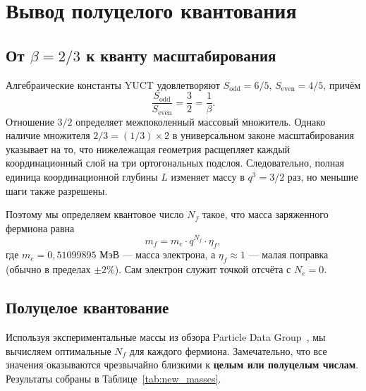 \documentclass[12pt,a4paper]{article}
\newcommand{\Sodd}{S_{\mathrm{odd}}}
\newcommand{\Seven}{S_{\mathrm{even}}}
\begin{document}
	\section{Вывод полуцелого квантования}
	
	\subsection{От \(\beta = 2/3\) к кванту масштабирования}
	
	Алгебраические константы YUCT удовлетворяют \(\Sodd = 6/5\), \(\Seven = 4/5\), причём
	\[
	\frac{\Sodd}{\Seven} = \frac{3}{2} = \frac{1}{\beta}.
	\]
	Отношение \(3/2\) определяет межпоколенный массовый множитель. Однако наличие множителя \(2/3 = (1/3) \times 2\) в универсальном законе масштабирования указывает на то, что нижележащая геометрия расщепляет каждый координационный слой на три ортогональных подслоя. Следовательно, полная единица координационной глубины \(L\) изменяет массу в \(q^3 = 3/2\) раз, но меньшие шаги также разрешены.
	
	Поэтому мы определяем квантовое число \(N_f\) такое, что масса заряженного фермиона равна
	\begin{equation}
		m_f = m_e \cdot q^{N_f} \cdot \eta_f,
		\label{eq:new}
	\end{equation}
	где \(m_e = 0,51099895\) МэВ — масса электрона, а \(\eta_f \approx 1\) — малая поправка (обычно в пределах \(\pm 2\%\)). Сам электрон служит точкой отсчёта с \(N_e = 0\).
	
	\subsection{Полуцелое квантование}
	
	Используя экспериментальные массы из обзора Particle Data Group~\cite{PDG2024}, мы вычисляем оптимальные \(N_f\) для каждого фермиона. Замечательно, что все значения оказываются чрезвычайно близкими к \textbf{целым или полуцелым числам}. Результаты собраны в Таблице~\ref{tab:new_masses}.
	
\end{document}
